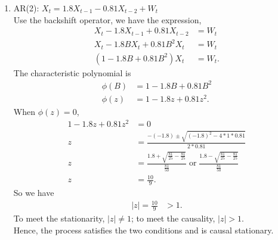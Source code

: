 \documentclass[10pt]{article}
\begin{document}
\begin{enumerate}[1)]
\item
AR(2): $X_t=1.8X_{t-1}-0.81X_{t-2}+W_t$\\
Use the backshift operator, we have the expression,
\begin{align*}
X_t-1.8X_{t-1}+0.81X_{t-2}&=W_t\\
X_t-1.8BX_t+0.81B^2X_t&=W_t\\
(1-1.8B+0.81B^2)X_t&=W_t.
\end{align*}
The characteristic polynomial is
\begin{align*}
\phi(B)&=1-1.8B+0.81B^2\\
\phi(z)&=1-1.8z+0.81z^2.
\end{align*}
When $\phi(z)=0$,
\begin{align*}
1-1.8z+0.81z^2&=0\\
z&=\frac{-(-1.8)\pm\sqrt{(-1.8)^2-4*1*0.81}}{2*0.81}\\
z&=\frac{1.8+\sqrt{\frac{81}{25}-\frac{81}{25}}}{\frac{81}{50}}\;\textrm{or}\;\frac{1.8-\sqrt{\frac{81}{25}-\frac{81}{25}}}{\frac{81}{50}}\\
z&=\frac{10}{9}.
\end{align*}
So we have
\begin{align*}
|z|=\frac{10}{9}&>1.
\end{align*}
To meet the stationarity, $|z|\neq1$; to meet the causality, $|z|>1$.\\
Hence, the process satisfies the two conditions and is causal stationary.

\end{enumerate}
\vspace{3mm}
\end{document}
